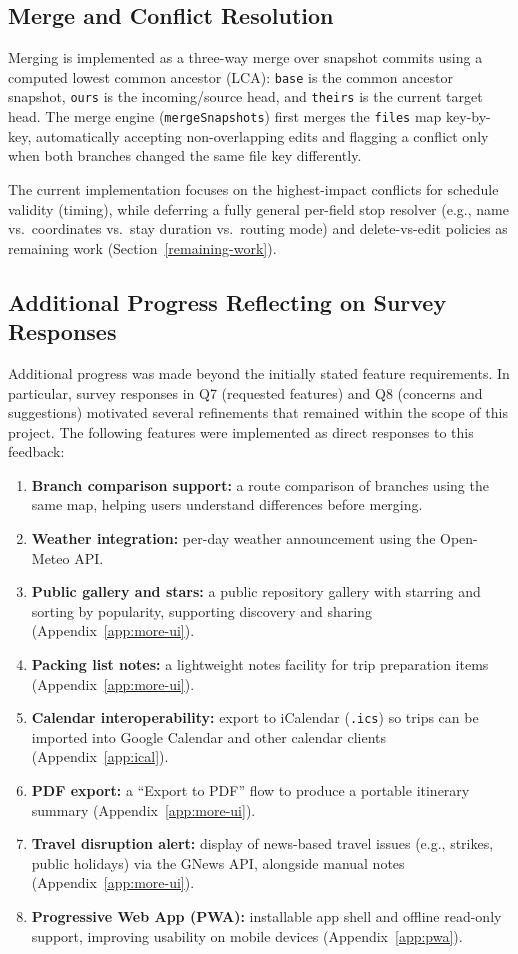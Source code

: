 \subsection{Merge and Conflict Resolution}
Merging is implemented as a three-way merge over snapshot commits using a computed lowest common ancestor (LCA): \texttt{base} is the common ancestor snapshot, \texttt{ours} is the incoming/source head, and \texttt{theirs} is the current target head. The merge engine (\texttt{mergeSnapshots}) first merges the \texttt{files} map key-by-key, automatically accepting non-overlapping edits and flagging a conflict only when both branches changed the same file key differently.

The current implementation focuses on the highest-impact conflicts for schedule validity (timing), while deferring a fully general per-field stop resolver (e.g., name vs.\ coordinates vs.\ stay duration vs.\ routing mode) and delete-vs-edit policies as remaining work (Section~\ref{remaining-work}).

\subsection{Additional Progress Reflecting on Survey Responses}
\label{additional-progress}
Additional progress was made beyond the initially stated feature requirements. In particular, survey responses in Q7 (requested features) and Q8 (concerns and suggestions) motivated several refinements that remained within the scope of this project. The following features were implemented as direct responses to this feedback:

\begin{enumerate}
  \item \textbf{Branch comparison support:} a route comparison of branches using the same map, helping users understand differences before merging.
  \item \textbf{Weather integration:} per-day weather announcement using the Open-Meteo API.
  \item \textbf{Public gallery and stars:} a public repository gallery with starring and sorting by popularity, supporting discovery and sharing (Appendix~\ref{app:more-ui}).
  \item \textbf{Packing list notes:} a lightweight notes facility for trip preparation items (Appendix~\ref{app:more-ui}).
  \item \textbf{Calendar interoperability:} export to iCalendar (\texttt{.ics}) so trips can be imported into Google Calendar and other calendar clients (Appendix~\ref{app:ical}).
  \item \textbf{PDF export:} a ``Export to PDF'' flow to produce a portable itinerary summary (Appendix~\ref{app:more-ui}).
  \item \textbf{Travel disruption alert:} display of news-based travel issues (e.g., strikes, public holidays) via the GNews API, alongside manual notes (Appendix~\ref{app:more-ui}).
  \item \textbf{Progressive Web App (PWA):} installable app shell and offline read-only support, improving usability on mobile devices (Appendix~\ref{app:pwa}).
\end{enumerate}

